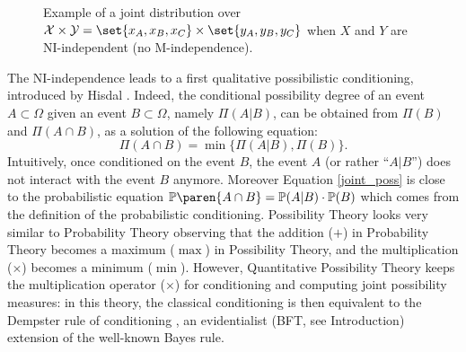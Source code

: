 \begin{figure}
\caption[Joint possibility distribution with NI-independence]{Example of a joint distribution over $\mathcal{X} \times \mathcal{Y} = \set{x_A,x_B,x_C} \times  \set{y_A,y_B,y_C}$ when $X$ and $Y$ are NI-independent
(no M-independence).} 
\label{figure_NIindep} 
\end{figure}



The NI-independence leads to a first qualitative possibilistic conditioning,
introduced by Hisdal \cite{Hisdal1978283}.
Indeed, the conditional possibility degree of an event $A \subset \Omega$ 
given an event $B \subset \Omega$,
namely $\Pi(A \vert B)$, can be obtained from $\Pi(B)$ and $\Pi(A \cap B)$,
as a solution of the following equation:
\begin{equation}
\label{joint_poss}
\Pi(A \cap B) = \min \Big\{ \Pi (A \vert B) , \Pi(B)  \Big\}.
\end{equation}
Intuitively, once conditioned on the event $B$,
the event $A$ (or rather ``$A \vert B$'') 
does not interact with the event $B$ anymore.
Moreover Equation \ref{joint_poss} is close to the probabilistic equation 
$\mathbb{P} \paren{ A \cap B } = \mathbb{P} (A \vert B) \cdot \mathbb{P} (B) $
which comes from the definition of the probabilistic conditioning.
Possibility Theory looks very similar to Probability Theory
observing that the addition ($+$) in Probability Theory becomes a maximum ($\max$)
in Possibility Theory, and the multiplication ($\times$)
becomes a minimum ($\min$). 
However, Quantitative Possibility Theory keeps the multiplication operator ($\times$)
for conditioning and computing joint possibility measures:
in this theory, the classical conditioning is then
equivalent to the Dempster rule of conditioning \cite{dempster1967},
an evidentialist (BFT, see Introduction) 
extension of the well-known Bayes rule.

